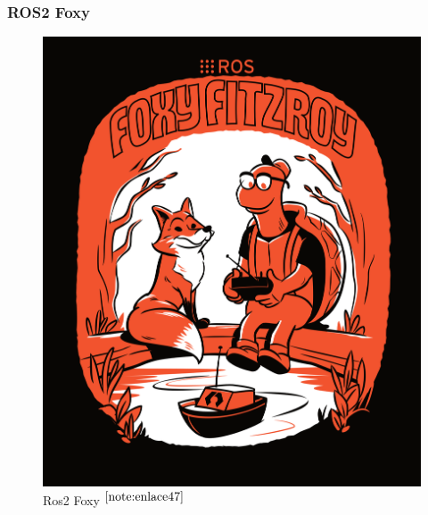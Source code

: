 \subsubsection{ROS2 Foxy}


\begin{figure}[ht!]
	\centering
	\begin{minipage}{0.4\linewidth}
		\centering
		\includegraphics[width=\linewidth]{figs/foxy.png}
		\caption*{\centering Ros2 Foxy $^{\ref{note:enlace47}}$} %
	\end{minipage}
	\hspace{2cm}
	\begin{minipage}{0.35\linewidth}
		\centering

\end{minipage}
\end{figure}
